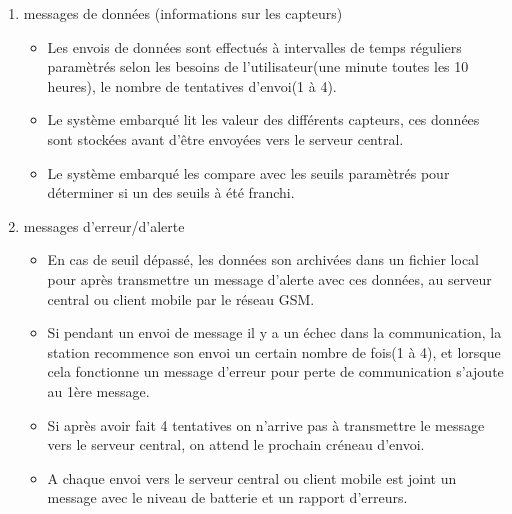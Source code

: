 \begin{description}
\begin{enumerate}
	\item messages de données (informations sur les capteurs)\\
		\begin{itemize}
		\item Les envois de données sont effectués à intervalles de temps 
        réguliers paramètrés selon les besoins de l'utilisateur(une minute 
        toutes les 10 heures), le nombre de tentatives d'envoi(1 à 4).\\
		\item Le système embarqué lit les valeur des différents capteurs, ces 
        données sont stockées avant d'être envoyées vers le serveur central.\\
		\item Le système embarqué les compare avec les seuils paramètrés pour 
        déterminer si un des seuils à été franchi. \\
		\end{itemize}

	\item messages d'erreur/d'alerte\\
		\begin{itemize}
		\item En cas de seuil dépassé, les données son archivées dans un fichier 
        local pour après transmettre un message d'alerte avec ces données, 
        au serveur central ou client mobile par le réseau GSM. \\
		\item Si pendant un envoi de message il y a un échec dans la 
        communication, la station recommence son envoi un certain nombre de 
        fois(1 à 4), et lorsque cela fonctionne un message d'erreur pour perte 
        de communication s'ajoute au 1ère message.\\
		\item Si après avoir fait 4 tentatives on n'arrive pas à transmettre le 
        message vers le serveur central, on attend le prochain créneau d'envoi.\\
		\item A chaque envoi vers le serveur central ou client mobile est joint 
        un message avec le niveau de batterie et un rapport d'erreurs.\\
		\end{itemize}\hfill\\
	\end{enumerate}


\end{description}
